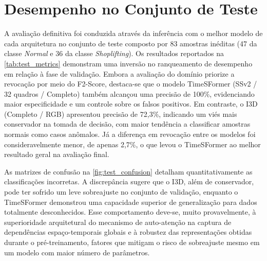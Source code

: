 \documentclass[12pt, %
openright, 
oneside, %
a4paper,    %
brazil]{facom-ufu-abntex2}
\begin{document}
\section[Desempenho no Conjunto de Teste]{Desempenho no Conjunto de Teste}
\label{sec:test_performance}
A avaliação definitiva foi conduzida através da inferência com o melhor modelo de cada arquitetura no conjunto de teste composto por 83 amostras inéditas (47 da classe \textit{Normal} e 36 da classe \textit{Shoplifting}). Os resultados reportados na \autoref{tab:test_metrics} demonstram uma inversão no ranqueamento de desempenho em relação à fase de validação. Embora a avaliação do domínio priorize a revocação por meio do F2-Score, destaca-se que o modelo TimeSFormer (SSv2 / 32 quadros / Completo) também alcançou uma precisão de 100\%, evidenciando maior especificidade e um controle sobre os falsos positivos. Em contraste, o I3D (Completo / RGB) apresentou precisão de 72,3\%, indicando um viés mais conservador na tomada de decisão, com maior tendência a classificar amostras normais como casos anômalos. Já a diferença em revocação entre os modelos foi consideravelmente menor, de apenas 2,7\%, o que levou o TimeSFormer ao melhor resultado geral na avaliação final.

\begin{table}[htbp]
\centering
\caption{Métricas no conjunto de teste dos melhores modelos (Precisão, Revocação e F2-Score).}
\label{tab:test_metrics}
\end{table}

As matrizes de confusão na \autoref{fig:test_confusion} detalham quantitativamente as classificações incorretas. A discrepância sugere que o I3D, além de conservador, pode ter sofrido um leve sobreajuste no conjunto de validação, enquanto o TimeSFormer demonstrou uma capacidade superior de generalização para dados totalmente desconhecidos. Esse comportamento deve-se, muito provavelmente, à superioridade arquitetural do mecanismo de auto-atenção na captura de dependências espaço-temporais globais e à robustez das representações obtidas durante o pré-treinamento, fatores que mitigam o risco de sobreajuste mesmo em um modelo com maior número de parâmetros.
\end{document}
